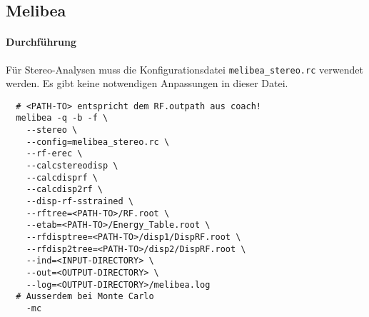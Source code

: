 \subsection{Melibea}%
\label{sub:melibea}

\paragraph{Durchführung}%

Für Stereo-Analysen muss die Konfigurationsdatei \texttt{melibea\_stereo.rc}
verwendet werden.
Es gibt keine notwendigen Anpassungen in dieser Datei.

\begin{lstlisting}
  # <PATH-TO> entspricht dem RF.outpath aus coach!
  melibea -q -b -f \
    --stereo \
    --config=melibea_stereo.rc \
    --rf-erec \
    --calcstereodisp \
    --calcdisprf \
    --calcdisp2rf \
    --disp-rf-sstrained \
    --rftree=<PATH-TO>/RF.root \
    --etab=<PATH-TO>/Energy_Table.root \
    --rfdisptree=<PATH-TO>/disp1/DispRF.root \
    --rfdisp2tree=<PATH-TO>/disp2/DispRF.root \
    --ind=<INPUT-DIRECTORY> \
    --out=<OUTPUT-DIRECTORY> \
    --log=<OUTPUT-DIRECTORY>/melibea.log
  # Ausserdem bei Monte Carlo
    -mc
\end{lstlisting}
